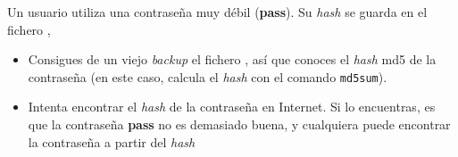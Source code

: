 \begin{homeworkProblem}

  \begin{multicols}{2}

    \null \vfill
    \begin{ActividadAdmin}
      Un usuario utiliza una contraseña muy débil (\textbf{pass}). Su \textit{hash} se guarda en el fichero ,
    \end{ActividadAdmin}
    \vfill \null
    \columnbreak


    \begin{ActividadHacker}
      \begin{itemize}
      \item Consigues de un viejo \textit{backup} el fichero , así que conoces el \textit{hash} md5 de la contraseña (en este caso, calcula el \textit{hash} con el comando \texttt{md5sum}).  
      \item Intenta encontrar el \textit{hash} de la contraseña en Internet. Si lo encuentras, es que la contraseña \textbf{pass} no es demasiado buena, y cualquiera puede encontrar la contraseña a partir del \textit{hash} 
      \end{itemize}
    \end{ActividadHacker}
  \end{multicols}

\end{homeworkProblem}


